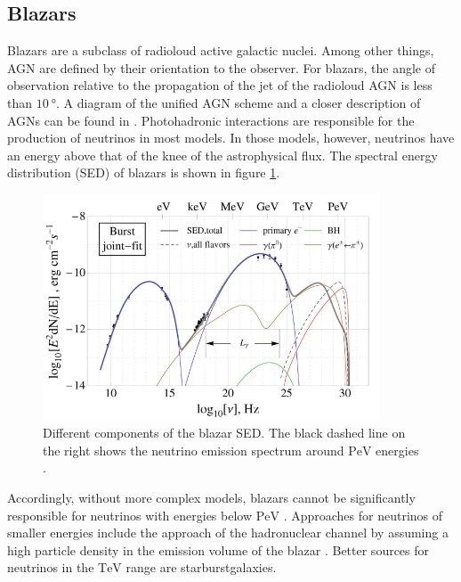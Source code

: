 \subsection{Blazars}
Blazars are a subclass of radioloud active galactic nuclei.
Among other things, AGN are defined by their orientation to the observer.
For blazars, the angle of observation relative to the propagation of the jet of the radioloud AGN is less than $\SI{10}{\degree}$.
A diagram of the unified AGN scheme and a closer description of AGNs can be found in \cite{agn}.
Photohadronic interactions are responsible for the production of neutrinos in most models.
In those models, however, neutrinos have an energy above that of the knee of the astrophysical flux.
The spectral energy distribution (SED) of blazars is shown in figure \ref{fig:sed}.
\begin{figure}
    \centering
    \includegraphics[width=10cm]{Plots/01_5_astroparticle/sed.jpeg}
    \caption{Different components of the blazar SED. The black dashed line on the right shows the neutrino emission spectrum around $\si{\peta\electronvolt}$ energies \cite{sed}.}
    \label{fig:sed}
\end{figure}
Accordingly, without more complex models, blazars cannot be significantly responsible for neutrinos with energies below $\si{\peta\electronvolt}$ \cite{blazar}.
Approaches for neutrinos of smaller energies include the approach of the hadronuclear channel by assuming a high particle density in the emission volume of the blazar \cite{eichmann}.
Better sources for neutrinos in the $\si{\tera\electronvolt}$ range are starburstgalaxies.

